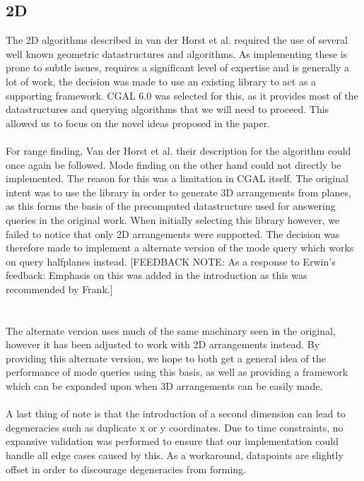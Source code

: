 \documentclass{article}
\newcommand{\fb}[1]{{\color{blue}#1}}
\newcommand{\fbnote}[1]{{\color{blue}[FEEDBACK NOTE: #1]\\}}
\begin{document}
\subsection{2D}
The 2D algorithms described in van der Horst et al. required the use
of several well known geometric datastructures and algorithms. As implementing
these is prone to subtle issues, requires a significant level of expertise and
is generally a lot of work, the decision was made to use an existing library to
act as a supporting framework. CGAL 6.0 \cite{cgal:foundations} was selected
for this, as it provides most of the datastructures and querying algorithms
that we will need to proceed. This allowed us to focus on the novel ideas
proposed in the paper. \\\\ For range finding, Van der Horst et al. their
description for the algorithm could once again be followed. Mode finding on the
other hand could not directly be implemented. The reason for this was a
limitation in CGAL itself. The original intent was to
use the library in order to generate 3D arrangements from planes, as this forms
the basis of the precomputed datastructure used for answering queries in the
original work. When initially selecting this library however, we failed to
notice that only 2D arrangements were supported. The decision was therefore
made to implement a alternate version of the mode query which works on query
halfplanes instead. \fbnote{As a response to Erwin's feedback: Emphasis on this was added in the introduction as this was recommended by Frank.}
\\\\ The alternate version uses much of the same machinary
seen in the original, however it has been adjusted to work with 2D arrangements
instead. By providing this alternate version, we hope to both get a general
idea of the performance of mode queries using this basis, as well as providing
a framework which can be expanded upon when 3D arrangements can be easily made. \\\\
\fb{
    A last thing of note is that the introduction of a second dimension can lead to degeneracies such as duplicate x or y coordinates. Due to time constraints, no expansive validation was performed to ensure that our implementation could handle all edge cases caused by this. As a workaround, datapoints are slightly offset in order to discourage degeneracies from forming.
}
\end{document}

